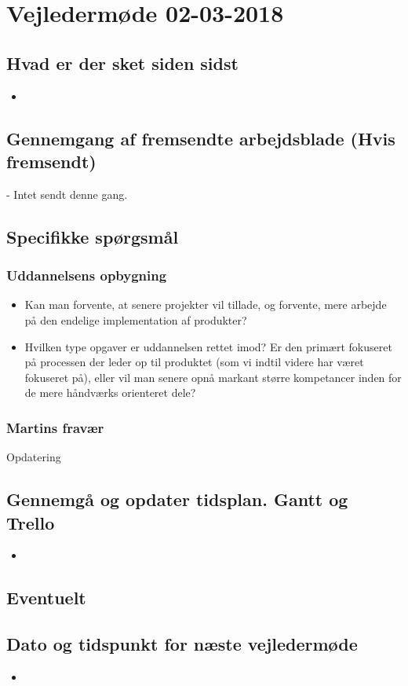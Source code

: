 \newpage
\section{Vejledermøde 02-03-2018}
\subsection{Hvad er der sket siden sidst}
    \begin{itemize}
        \item 
    \end{itemize}
\subsection{Gennemgang af fremsendte arbejdsblade (Hvis fremsendt)}
- Intet sendt denne gang.

\subsection{Specifikke spørgsmål}
\subsubsection{Uddannelsens opbygning}
    \begin{itemize}
        \item Kan man forvente, at senere projekter vil tillade, og forvente, mere arbejde på den endelige implementation af produkter?
        \item Hvilken type opgaver er uddannelsen rettet imod? Er den primært fokuseret på processen der leder op til produktet (som vi indtil videre har været fokuseret på), eller vil man senere opnå markant større kompetancer inden for de mere håndværks orienteret dele? 
    \end{itemize}
\subsubsection{Martins fravær}
Opdatering

\subsection{Gennemgå og opdater tidsplan. Gantt og Trello}
    \begin{itemize}
        \item 
    \end{itemize}
\subsection{Eventuelt}


\subsection{Dato og tidspunkt for næste vejledermøde}
    \begin{itemize}
        \item 
    \end{itemize}